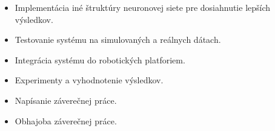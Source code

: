 \begin{itemize}
    \item Implementácia iné štruktúry neuronovej siete pre dosiahnutie lepších výsledkov.
    \item Testovanie systému na simulovaných a reálnych dátach.
    \item Integrácia systému do robotických platforiem.
    \item Experimenty a vyhodnotenie výsledkov.
    \item Napísanie záverečnej práce.
    \item Obhajoba záverečnej práce.
\end{itemize}